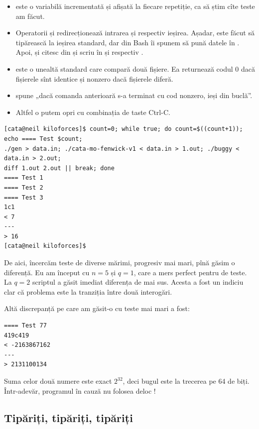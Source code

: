 \documentclass[../main.tex]{subfiles}
\begin{document}
\begin{itemize}
  \item {} este o variabilă incrementată și afișată la fiecare repetiție, ca să știm cîte teste am făcut.

  \item Operatorii \ccode{<} și \ccode{>} redirecționează intrarea și respectiv ieșirea. Așadar,  este făcut să tipărească la ieșirea standard, dar din Bash îi spunem să pună datele în . Apoi,  și  citesc din  și scriu în  și respectiv .

  \item {} este o unealtă standard care compară două fișiere. Ea returnează codul 0 dacă fișierele sînt identice și nonzero dacă fișierele diferă.

  \item {} spune „dacă comanda anterioară s-a terminat cu cod nonzero, ieși din buclă”.

  \item Altfel o putem opri cu combinația de taste Ctrl-C.
\end{itemize}

\begin{verbatim}
[cata@neil kiloforces]$ count=0; while true; do count=$((count+1)); echo ==== Test $count;
./gen > data.in; ./cata-mo-fenwick-v1 < data.in > 1.out; ./buggy < data.in > 2.out;
diff 1.out 2.out || break; done
==== Test 1
==== Test 2
==== Test 3
1c1
< 7
---
> 16
[cata@neil kiloforces]$
\end{verbatim}

De aici, încercăm teste de diverse mărimi, progresiv mai mari, pînă găsim o diferență. Eu am început cu $n=5$ și $q=1$, care a mers perfect pentru  de teste. La $q=2$ scriptul a găsit imediat diferența de mai sus. Acesta a fost un indiciu clar că problema este la tranziția între două interogări.

Altă discrepanță pe care am găsit-o cu teste mai mari a fost:

\begin{verbatim}
==== Test 77
419c419
< -2163867162
---
> 2131100134
\end{verbatim}

Suma celor două numere este exact $2^{32}$, deci bugul este la trecerea pe 64 de biți. Într-adevăr, programul în cauză nu folosea deloc !


\subsection{Tipăriți, tipăriți, tipăriți}
\end{document}
